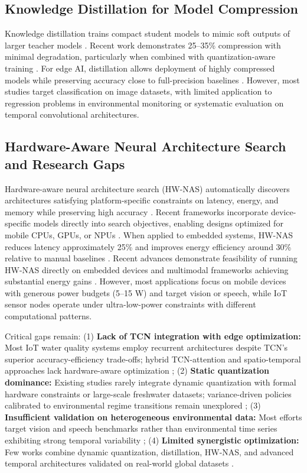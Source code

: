 \documentclass[12pt,a4paper]{article}
\begin{document}
\subsection{Knowledge Distillation for Model Compression}

Knowledge distillation trains compact student models to mimic soft outputs of larger teacher models \citep{gou2021kd}. Recent work demonstrates 25--35\% compression with minimal degradation, particularly when combined with quantization-aware training \citep{wu2023kdfed, huang2024billm}. For edge AI, distillation allows deployment of highly compressed models while preserving accuracy close to full-precision baselines \citep{wu2023kdfed}. However, most studies target classification on image datasets, with limited application to regression problems in environmental monitoring or systematic evaluation on temporal convolutional architectures.

\subsection{Hardware-Aware Neural Architecture Search and Research Gaps}

Hardware-aware neural architecture search (HW-NAS) automatically discovers architectures satisfying platform-specific constraints on latency, energy, and memory while preserving high accuracy \citep{wu2023kdfed, huang2024billm}. Recent frameworks incorporate device-specific models directly into search objectives, enabling designs optimized for mobile CPUs, GPUs, or NPUs \citep{chitty2022hwnas, sinha2024hwevnas}. When applied to embedded systems, HW-NAS reduces latency approximately 25\% and improves energy efficiency around 30\% relative to manual baselines \citep{wu2023kdfed}. Recent advances demonstrate feasibility of running HW-NAS directly on embedded devices \citep{sinha2024hwevnas} and multimodal frameworks achieving substantial energy gains \citep{king2025micronasapprox}. However, most applications focus on mobile devices with generous power budgets (5--15 W) and target vision or speech, while IoT sensor nodes operate under ultra-low-power constraints with different computational patterns.

Critical gaps remain: (1) \textbf{Lack of TCN integration with edge optimization:} Most IoT water quality systems employ recurrent architectures despite TCN's superior accuracy-efficiency trade-offs; hybrid TCN-attention and spatio-temporal approaches lack hardware-aware optimization \citep{lin2021tcan, luo2024moderntcn}; (2) \textbf{Static quantization dominance:} Existing studies rarely integrate dynamic quantization with formal hardware constraints or large-scale freshwater datasets; variance-driven policies calibrated to environmental regime transitions remain unexplored \citep{gholami2021quant, motetti2024joint}; (3) \textbf{Insufficient validation on heterogeneous environmental data:} Most efforts target vision and speech benchmarks rather than environmental time series exhibiting strong temporal variability \citep{unep2024gemswater}; (4) \textbf{Limited synergistic optimization:} Few works combine dynamic quantization, distillation, HW-NAS, and advanced temporal architectures validated on real-world global datasets \citep{liu2025lowbit, forhad2024iot}.
\end{document}
